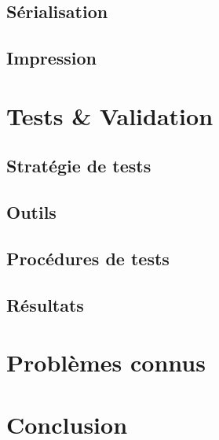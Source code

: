 \documentclass[11pt,a4paper,oldfontcommands]{memoir}
\begin{document}
\section{Sérialisation}

\section{Impression}


\chapter{Tests \& Validation}

\section{Stratégie de tests}

\section{Outils}

\section{Procédures de tests}

\section{Résultats}


\chapter{Problèmes connus}


\chapter{Conclusion}
\end{document}
